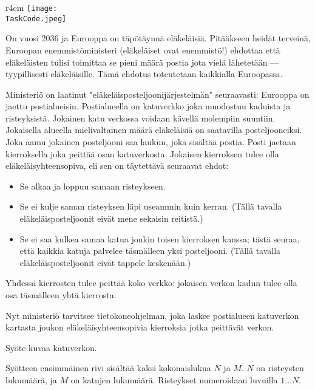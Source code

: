 \documentclass{boi2014-fi}
\renewcommand{\TaskCode}{postmen}
\begin{document}
    \begin{wrapfigure}[8]{r}{4cm}
        \vspace{-18pt}
        \texttt{[image: \\TaskCode.jpeg]}
    \end{wrapfigure}
    
    On vuosi 2036 ja Eurooppa on täpötäynnä eläkeläisiä. Pitääkseen
    heidät terveinä, Euroopan enemmistöministeri (eläkeläiset ovat
    enemmistö!) ehdottaa että eläkeläisten tulisi toimittaa se pieni määrä
    postia jota vielä lähetetään --- tyypillisesti eläkeläisille. Tämä ehdotus
    toteutetaan kaikkialla Euroopassa.
    
    Ministeriö on laatinut "eläkeläisposteljoonijärjestelmän" seuraavasti:
    Eurooppa on jaettu postialueisin. Postialueella on katuverkko joka muodostuu
    kaduista ja risteyksistä. Jokainen katu verkossa voidaan kävellä molempiin 
    suuntiin. Jokaisella alueella mielivaltainen määrä eläkeläisiä on saatavilla
    posteljooneiksi. Joka aamu jokainen posteljooni saa laukun, joka sisältää
    postia. Posti jaetaan kierroksella joka peittää osan katuverkosta. Jokaisen
    kierroksen tulee olla eläkeläisyhteensopiva, eli sen on täytettävä seuraavat
    ehdot:
    \begin{itemize}
        \item Se alkaa ja loppuu samaan risteykseen.
        \item Se ei kulje saman risteyksen läpi useammin kuin kerran. (Tällä
            tavalla eläkeläisposteljoonit eivät mene sekaisin reitistä.)
        \item Se ei saa kulkea samaa katua jonkin toisen kierroksen kanssa;
            tästä seuraa, että kaikkia katuja palvelee täsmälleen yksi
            posteljooni. (Tällä tavalla eläkeläisposteljoonit eivät tappele
            keskenään.)
    \end{itemize}

    Yhdessä kierrosten tulee peittää koko verkko: jokaisen verkon kadun tulee
    olla osa täsmälleen yhtä kierrosta.

    \Task
    Nyt ministeriö tarvitsee tietokoneohjelman, joka laskee postialueen katuverkon 
    kartasta joukon eläkeläisyhteensopivia kierroksia jotka peittävät verkon.

    \Input
    Syöte kuvaa katuverkon.
    
    Syötteen ensimmäinen rivi sisältää kaksi kokonaislukua $N$ ja $M$. $N$ on
    risteysten lukumäärä, ja $M$ on katujen lukumäärä. Risteykset numeroidaan
    luvuilla $1\ldots N$.
\end{document}
